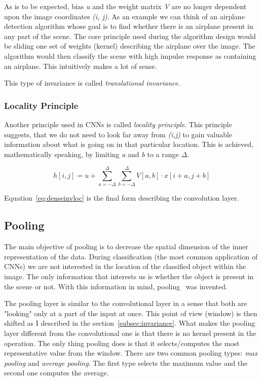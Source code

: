 As is to be expected, bias \textit{u} and the weight matrix \textit{V} are no longer dependent upon the image
coordinates \textit{(i, j)}.
As an example we can think of an airplane detection algorithm whose goal is to find whether there is an airplane
present in any part of the scene.
The core principle used during the algorithm design would be sliding one set of weights (kernel) describing the
airplane over the image.
The algorithm would then classify the scene with high impulse response as containing an airplane.
This intuitively makes a lot of sense.

This type of invariance is called \textit{translational invariance}.

\subsubsection{Locality Principle}\label{subsec:locality}
Another principle used in CNNs is called \textit{locality principle}.
This principle suggests, that we do not need to look far away from \textit{(i,j)} to gain valuable information about
what is going on in that particular location.
This is achieved, mathematically speaking, by limiting \textit{a} and \textit{b} to a range $\Delta$.

\begin{equation}
    \label{eq:denseinvloc}
    h[i, j] = u + \sum_{a=-\Delta}^{\Delta} \sum_{b=-\Delta}^{\Delta} V[a,b] \cdot x[i+a,j+b]
\end{equation}

Equation~\ref{eq:denseinvloc} is the final form describing the convolution layer.

\subsection{Pooling}\label{subsec:pooling}
The main objective of pooling is to decrease the spatial dimension of the inner representation of the data.
During classification (the most common application of CNNs) we are not interested in the location of the classified
object within the image.
The only information that interests us is whether the object is present in the scene or not.
With this information in mind, pooling~\cite{PoolingLayer} was invented.

The pooling layer is similar to the convolutional layer in a sense that both are "looking" only at a part of the input
at once.
This point of view (window) is then shifted as I described in the section~\ref{subsec:invariance}.
What makes the pooling layer different from the convolutional one is that there is no kernel present in the operation.
The only thing pooling does is that it selects/computes the most representative value from the window.
There are two common pooling types: \textit{max pooling} and \textit{average pooling}.
The first type selects the maximum value and the second one computes the average.

